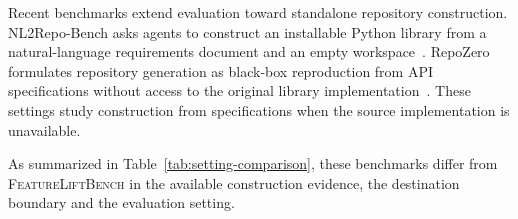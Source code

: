 \documentclass[acmsmall,screen,review,anonymous]{acmart}
\newcommand{\flb}{\textsc{FeatureLiftBench}\xspace}
\begin{document}
Recent benchmarks extend evaluation toward standalone repository construction.
NL2Repo-Bench asks agents to construct an installable Python library from a
natural-language requirements document and an empty
workspace~\cite{ding2026nl2repo}. RepoZero formulates repository generation as
black-box reproduction from API specifications without access to the original
library implementation~\cite{zhang2026repozero}. These settings study construction
from specifications when the source implementation is unavailable.

As summarized in Table~\ref{tab:setting-comparison}, these benchmarks differ
from \flb in the available construction evidence, the destination boundary and
the evaluation setting.







\end{document}
